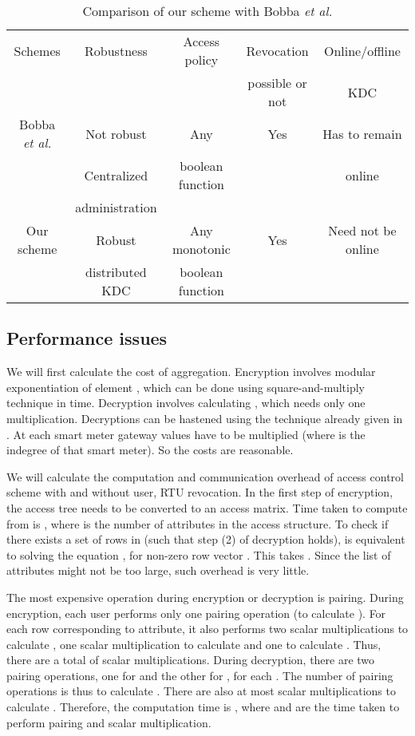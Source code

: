 \documentclass[conference]{IEEEtran}[10pt]
\begin{document}
\begin{table*}
\caption{Comparison of our scheme  with Bobba \emph{et al.}\cite{BKAA09}}
\begin{center}
{\small
\begin{tabular}{|c|c|c|c|c|}
\hline
Schemes & Robustness & Access policy & Revocation  & Online/offline  \\
 &  &  & possible or not & KDC  \\
\hline
Bobba \emph{et al.} \cite{BKAA09} & Not robust & Any  & Yes & Has to remain\\
& Centralized & boolean function &  & online   \\
 & administration &  &  &   \\
\hline
Our scheme & Robust & Any monotonic  & Yes & Need not be online \\
& distributed KDC &  boolean function &  &  \\
\hline
\end{tabular}
}
\end{center}
\label{table:comp}
\end{table*}



\subsection{Performance issues}
\label{subsec:performance}

We will first calculate the cost of aggregation. 
Encryption involves modular exponentiation of element , which can be done using square-and-multiply technique in  time. 
Decryption involves calculating , which needs only one multiplication. 
Decryptions can be hastened using the technique already given in \cite{P99}. 
At each smart meter gateway  values have to be multiplied (where  is the indegree of that smart meter). 
So the costs are reasonable. 


We will calculate the computation and communication overhead of access control scheme with and without user, RTU revocation.
In the first step of encryption, the access tree needs to be converted to an access matrix. 
Time taken to compute  from  is , where  is the number of attributes in the access structure.
To check if there exists a set of rows in  (such that step (2) of decryption holds), is equivalent to solving the equation
, for non-zero row vector .
This takes .
Since the list of attributes might not be too large, such overhead is very little. 

The most expensive operation during encryption or decryption is pairing. 
During encryption,  each user  performs only one pairing operation (to calculate ).
For each row  corresponding to attribute, it also performs two scalar multiplications to calculate ,
one scalar multiplication to calculate
 and one to calculate .
Thus, there are a total of  scalar multiplications.
During decryption, there are two pairing operations, one for  and the other for ,
for each .
The number of pairing operations is thus  to calculate .
There are also at most  scalar multiplications to calculate .
Therefore, the computation time is , where  and  are  the time taken to perform pairing and scalar multiplication.
\end{document}
